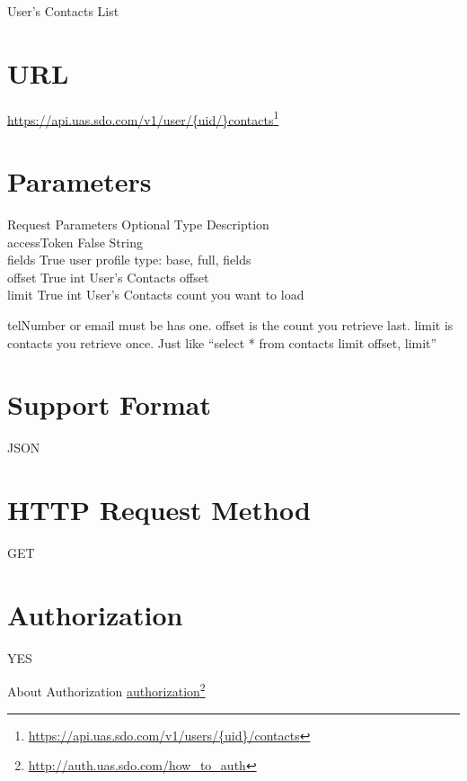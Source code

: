 User's Contacts List 

\section{URL}
\label{url}

\href{https://api.uas.sdo.com/v1/users/{uid}/contacts}{https:/\slash api.uas.sdo.com\slash v1\slash user\slash \{uid\slash \}contacts}\footnote{\href{https://api.uas.sdo.com/v1/users/{uid}/contacts}{https:/\slash api.uas.sdo.com\slash v1\slash users\slash \{uid\}\slash contacts}}

\section{Parameters}
\label{parameters}

Request Parameters \textbar{} Optional \textbar{} Type \textbar{} Description\\
accessToken \textbar{} False \textbar{} String\textbar{}\\
fields \textbar{} True \textbar{} user profile type: base, full, fields\\
offset \textbar{} True \textbar{} int \textbar{} User's Contacts offset\\
limit \textbar{} True \textbar{} int \textbar{} User's Contacts count you want to load 

telNumber or email must be has one.
offset is the count you retrieve last.
limit is contacts you retrieve once.
Just like ``select * from contacts limit offset, limit''

\section{Support Format}
\label{supportformat}

JSON 

\section{HTTP Request Method}
\label{httprequestmethod}

GET

\section{Authorization}
\label{authorization}

YES

About Authorization \href{http://auth.uas.sdo.com/how_to_auth}{authorization}\footnote{\href{http://auth.uas.sdo.com/how_to_auth}{http:/\slash auth.uas.sdo.com\slash how\_to\_auth}} 

